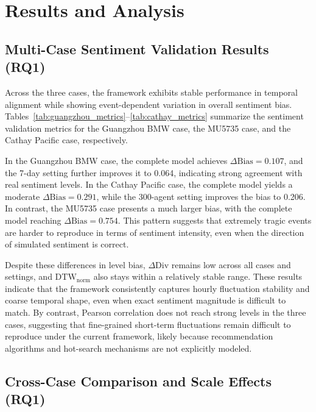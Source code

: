 \section{Results and Analysis}

\subsection{Multi-Case Sentiment Validation Results (RQ1)}

Across the three cases, the framework exhibits stable performance in temporal alignment while showing event-dependent variation in overall sentiment bias. Tables~\ref{tab:guangzhou_metrics}--\ref{tab:cathay_metrics} summarize the sentiment validation metrics for the Guangzhou BMW case, the MU5735 case, and the Cathay Pacific case, respectively.





In the Guangzhou BMW case, the complete model achieves \(\Delta\mathrm{Bias}=0.107\), and the 7-day setting further improves it to 0.064, indicating strong agreement with real sentiment levels. In the Cathay Pacific case, the complete model yields a moderate \(\Delta\mathrm{Bias}=0.291\), while the 300-agent setting improves the bias to 0.206. In contrast, the MU5735 case presents a much larger bias, with the complete model reaching \(\Delta\mathrm{Bias}=0.754\). This pattern suggests that extremely tragic events are harder to reproduce in terms of sentiment intensity, even when the direction of simulated sentiment is correct.

Despite these differences in level bias, \(\Delta\mathrm{Div}\) remains low across all cases and settings, and \(\mathrm{DTW}_{\mathrm{norm}}\) also stays within a relatively stable range. These results indicate that the framework consistently captures hourly fluctuation stability and coarse temporal shape, even when exact sentiment magnitude is difficult to match. By contrast, Pearson correlation does not reach strong levels in the three cases, suggesting that fine-grained short-term fluctuations remain difficult to reproduce under the current framework, likely because recommendation algorithms and hot-search mechanisms are not explicitly modeled.

\subsection{Cross-Case Comparison and Scale Effects (RQ1)}

